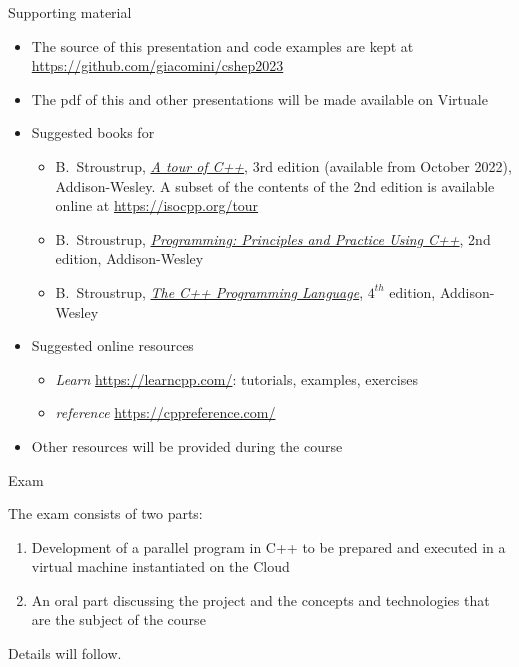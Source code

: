 \begin{frame}{Supporting material}

  \begin{itemize}

  \item The source of this presentation and code examples are kept at
    \url{https://github.com/giacomini/cshep2023}

  \item The pdf of this and other presentations will be made available on
    Virtuale

  \item Suggested books for \Cpp{}
    \begin{itemize}
    \item B.~Stroustrup, \href{https://stroustrup.com/tour3.html}{\textit{A tour
          of C++}}, 3rd edition (available from October 2022), Addison-Wesley. A
      subset of the contents of the 2nd edition is available online at
      \url{https://isocpp.org/tour}
  
    \item B.~Stroustrup,
      \href{https://stroustrup.com/programming.html}{\textit{Programming:
          Principles and Practice Using C++}}, 2nd edition, Addison-Wesley

    \item B.~Stroustrup, \href{https://stroustrup.com/4th.html}{\textit{The C++
          Programming Language}}, $4^{th}$ edition, Addison-Wesley
    \end{itemize}

  \item Suggested online resources
    \begin{itemize}
    \item \textit{Learn \Cpp{}} \url{https://learncpp.com/}: tutorials,
      examples, exercises
    \item \textit{\Cpp{} reference} \url{https://cppreference.com/}
    \end{itemize}

  \item Other resources will be provided during the course
  \end{itemize}

\end{frame}

\begin{frame}{Exam}

  The exam consists of two parts:

  \begin{enumerate}
  \item Development of a parallel program in C++ to be prepared and executed in
    a virtual machine instantiated on the Cloud
  \item An oral part discussing the project and the concepts and technologies
    that are the subject of the course
  \end{enumerate}

  Details will follow.

\end{frame}

